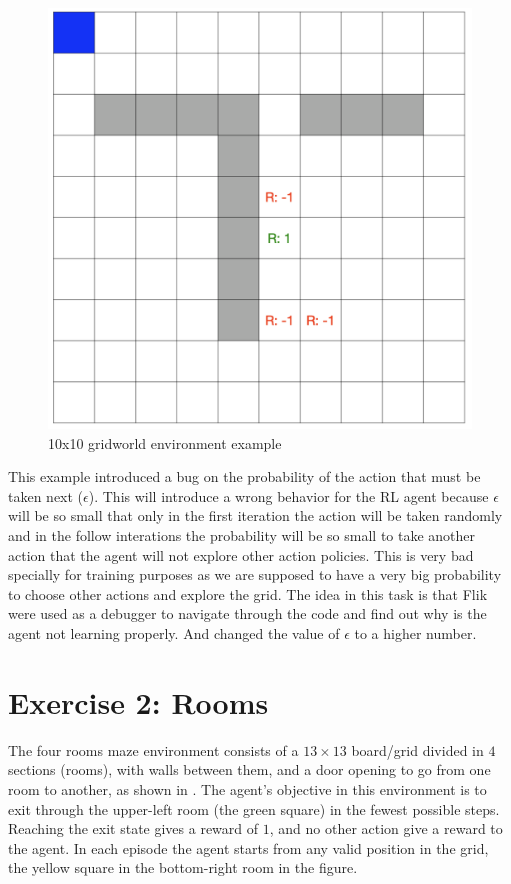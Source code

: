 \begin{figure}[h]
  \centering
  \includegraphics[width=0.5\columnwidth]{figures/gridworld.png}
  \caption{10x10 gridworld environment example}
  \label{fig:gridworld}
\end{figure}

This example introduced a bug on the probability of the action that must be taken next ($\epsilon$). 
This will introduce a wrong behavior for the \ac{RL} 
agent because $\epsilon$ will be so small that only in the first iteration the action will be taken randomly 
and in the follow interations the probability will be so small to take another action that the agent will not explore
other action policies. This is very bad specially for training purposes as we are supposed to have a very big 
probability to choose other actions and explore the grid. The idea in this task is that Flik were used 
as a debugger to navigate through the code and find out why is the agent not learning properly. And changed 
the value of $\epsilon$ to a higher number. 

\section{Exercise 2: Rooms}

The four rooms maze environment consists of a $13\times 13$ board/grid divided in $4$ sections 
(\ie rooms), with walls between them, and a door opening to go from one room to another, as shown 
in . The agent's objective in this environment is to exit through the upper-left room 
(the green square) in the fewest possible steps. Reaching the exit state gives a reward of $1$, and no 
other action give a reward to the agent. In each episode the agent starts from any valid position in the 
grid, \eg the yellow square in the bottom-right room in the figure. 

